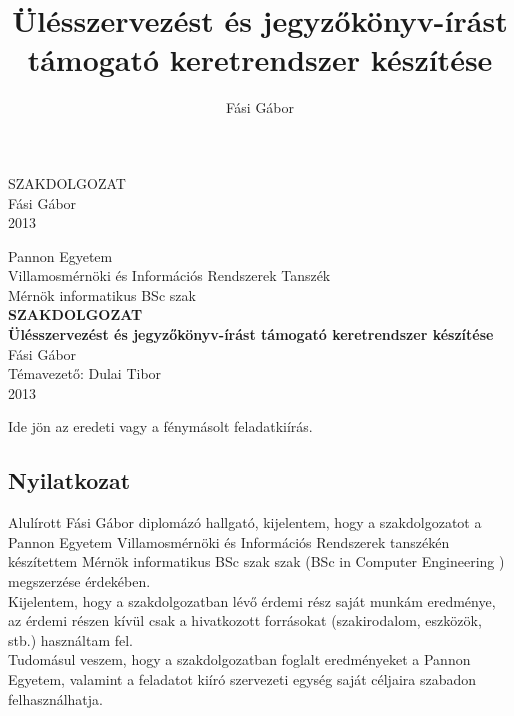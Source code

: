 \documentclass[a4paper,12pt,oneside]{report}
\title{Ülésszervezést és jegyzőkönyv-írást támogató keretrendszer készítése}
\author{Fási Gábor}
\date{}
\begin{document}
\setcounter{chapter}{1}

\pagestyle{empty}
{
    \begin{center}
    \vspace*{5cm}
    {
        \Huge SZAKDOLGOZAT}\\
        \vspace*{10cm}
        {\LARGE Fási Gábor}\\
        \vspace*{3cm}
        {\LARGE 2013}
    \end{center}
}
\newpage

\begin{center}
{
    \Large Pannon Egyetem\\
    Villamosmérnöki és Információs Rendszerek
Tanszék\vspace*{3mm}\\
    Mérnök informatikus BSc szak
}
    \vspace*{2cm}\\
    {\LARGE \bf SZAKDOLGOZAT}
    \vspace{3cm}\\
    {\LARGE\bf Ülésszervezést és jegyzőkönyv-írást támogató keretrendszer   készítése}
    \vspace{3cm}\\
    {\large Fási Gábor}
    \vspace{6cm}
    \\
    {\large Témavezető: Dulai Tibor}
    \vspace{1cm}\\
    {\large 2013}
\end{center}
\normalsize
\newpage

Ide jön az eredeti vagy a fénymásolt feladatkiírás.
\newpage

\begin{center}
\section*{Nyilatkozat}
\end{center}

Alulírott Fási Gábor diplomázó hallgató, kijelentem, hogy a szakdolgozatot a Pannon Egyetem Villamosmérnöki és Információs Rendszerek tanszékén készítettem Mérnök informatikus BSc szak szak (BSc in Computer Engineering
) megszerzése érdekében.\\
Kijelentem, hogy a szakdolgozatban lévő érdemi rész saját munkám eredménye, az érdemi részen kívül csak a hivatkozott forrásokat (szakirodalom, eszközök, stb.) használtam fel.\\
Tudomásul veszem, hogy a szakdolgozatban foglalt eredményeket a Pannon Egyetem, valamint a feladatot kiíró szervezeti egység saját céljaira szabadon felhasználhatja.
\newline
\end{document}
